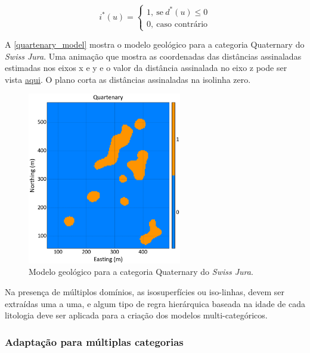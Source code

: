 \begin{equation}
	i^*(u)=\begin{cases}
	1,\:\textrm{se}\:d^*(u)\leq0\\
	0,\:\textrm{caso contrário}\end{cases}
    \label{classifier}
\end{equation}

A \autoref{quartenary_model} mostra o modelo geológico para a categoria Quaternary do \textit{Swiss Jura}. Uma animação que mostra as coordenadas das distâncias assinaladas estimadas nos eixos x e y e o valor da distância assinalada no eixo z pode ser vista \href{https://github.com/robertorolo/assessing_geological_model_uncertainty_with_probability_fields/blob/main/anim_onecat.gif}{aqui}. O plano corta as distâncias assinaladas na isolinha zero. 

\begin{figure}[H]
	\centering
	\caption{\label{quartenary_model}Modelo geológico para a categoria Quaternary do \textit{Swiss Jura}.}
	\includegraphics[width=0.6\textwidth]{capitulo_2/imagens/geomodel_quaternary.png}
\end{figure}

Na presença de múltiplos domínios, as isosuperfícies ou iso-linhas, devem ser extraídas uma a uma, e algum tipo de regra hierárquica baseada na idade de cada litologia deve ser aplicada para a criação dos modelos multi-categóricos.

\subsubsection{Adaptação para múltiplas categorias}

